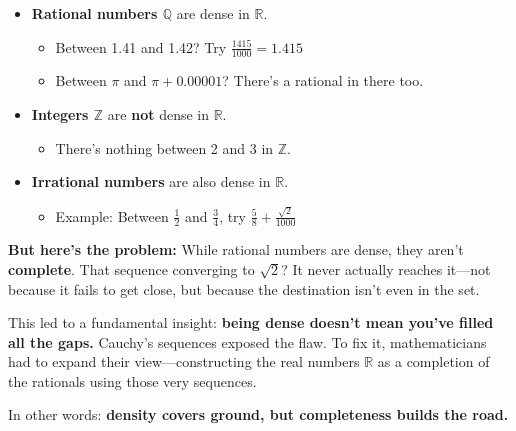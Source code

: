 \begin{itemize}
    \item \textbf{Rational numbers \( \mathbb{Q} \)} are dense in \( \mathbb{R} \).
    \begin{itemize}
        \item Between 1.41 and 1.42? Try \( \frac{1415}{1000} = 1.415 \)
        \item Between \( \pi \) and \( \pi + 0.00001 \)? There’s a rational in there too.
    \end{itemize}

    \item \textbf{Integers \( \mathbb{Z} \)} are \textbf{not} dense in \( \mathbb{R} \).
    \begin{itemize}
        \item There’s nothing between 2 and 3 in \( \mathbb{Z} \).
    \end{itemize}

    \item \textbf{Irrational numbers} are also dense in \( \mathbb{R} \).
    \begin{itemize}
        \item Example: Between \( \frac{1}{2} \) and \( \frac{3}{4} \), try \( \frac{5}{8} + \frac{\sqrt{2}}{1000} \)
    \end{itemize}
\end{itemize}

\bigskip

\textbf{But here’s the problem:} While rational numbers are dense, they aren’t \textbf{complete}. That sequence converging to \( \sqrt{2} \)? It never actually reaches it—not because it fails to get close, but because the destination isn’t even in the set.

This led to a fundamental insight: \textbf{being dense doesn’t mean you’ve filled all the gaps.} Cauchy’s sequences exposed the flaw. To fix it, mathematicians had to expand their view—constructing the real numbers \( \mathbb{R} \) as a completion of the rationals using those very sequences.

In other words: \textbf{density covers ground, but completeness builds the road.}

\bigskip



